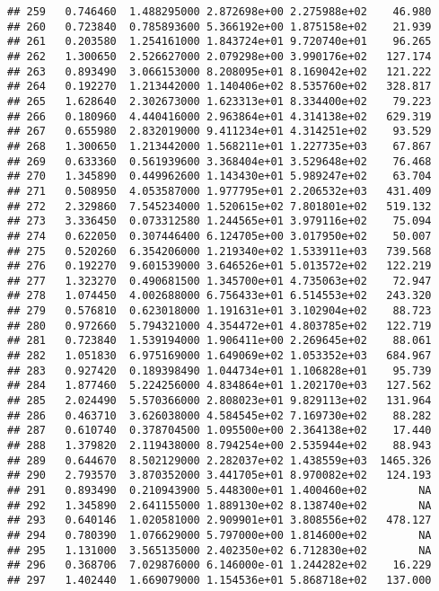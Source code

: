 \documentclass[
]{article}
\begin{document}
\begin{verbatim}
## 259   0.746460  1.488295000 2.872698e+00 2.275988e+02    46.980
## 260   0.723840  0.785893600 5.366192e+00 1.875158e+02    21.939
## 261   0.203580  1.254161000 1.843724e+01 9.720740e+01    96.265
## 262   1.300650  2.526627000 2.079298e+00 3.990176e+02   127.174
## 263   0.893490  3.066153000 8.208095e+01 8.169042e+02   121.222
## 264   0.192270  1.213442000 1.140406e+02 8.535760e+02   328.817
## 265   1.628640  2.302673000 1.623313e+01 8.334400e+02    79.223
## 266   0.180960  4.440416000 2.963864e+01 4.314138e+02   629.319
## 267   0.655980  2.832019000 9.411234e+01 4.314251e+02    93.529
## 268   1.300650  1.213442000 1.568211e+01 1.227735e+03    67.867
## 269   0.633360  0.561939600 3.368404e+01 3.529648e+02    76.468
## 270   1.345890  0.449962600 1.143430e+01 5.989247e+02    63.704
## 271   0.508950  4.053587000 1.977795e+01 2.206532e+03   431.409
## 272   2.329860  7.545234000 1.520615e+02 7.801801e+02   519.132
## 273   3.336450  0.073312580 1.244565e+01 3.979116e+02    75.094
## 274   0.622050  0.307446400 6.124705e+00 3.017950e+02    50.007
## 275   0.520260  6.354206000 1.219340e+02 1.533911e+03   739.568
## 276   0.192270  9.601539000 3.646526e+01 5.013572e+02   122.219
## 277   1.323270  0.490681500 1.345700e+01 4.735063e+02    72.947
## 278   1.074450  4.002688000 6.756433e+01 6.514553e+02   243.320
## 279   0.576810  0.623018000 1.191631e+01 3.102904e+02    88.723
## 280   0.972660  5.794321000 4.354472e+01 4.803785e+02   122.719
## 281   0.723840  1.539194000 1.906411e+00 2.269645e+02    88.061
## 282   1.051830  6.975169000 1.649069e+02 1.053352e+03   684.967
## 283   0.927420  0.189398490 1.044734e+01 1.106828e+01    95.739
## 284   1.877460  5.224256000 4.834864e+01 1.202170e+03   127.562
## 285   2.024490  5.570366000 2.808023e+01 9.829113e+02   131.964
## 286   0.463710  3.626038000 4.584545e+02 7.169730e+02    88.282
## 287   0.610740  0.378704500 1.095500e+00 2.364138e+02    17.440
## 288   1.379820  2.119438000 8.794254e+00 2.535944e+02    88.943
## 289   0.644670  8.502129000 2.282037e+02 1.438559e+03  1465.326
## 290   2.793570  3.870352000 3.441705e+01 8.970082e+02   124.193
## 291   0.893490  0.210943900 5.448300e+01 1.400460e+02        NA
## 292   1.345890  2.641155000 1.889130e+02 8.138740e+02        NA
## 293   0.640146  1.020581000 2.909901e+01 3.808556e+02   478.127
## 294   0.780390  1.076629000 5.797000e+00 1.814600e+02        NA
## 295   1.131000  3.565135000 2.402350e+02 6.712830e+02        NA
## 296   0.368706  7.029876000 6.146000e-01 1.244282e+02    16.229
## 297   1.402440  1.669079000 1.154536e+01 5.868718e+02   137.000

\end{verbatim}
\end{document}
